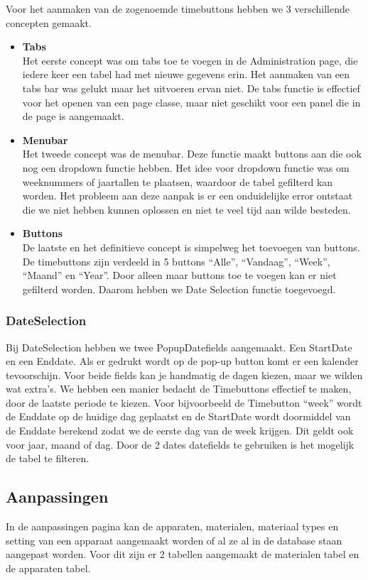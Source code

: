 Voor het aanmaken van de zogenoemde timebuttons hebben we 3 verschillende concepten gemaakt.
\begin {itemize}
\item \textbf{Tabs}\\
Het eerste concept was om tabs toe te voegen in de Administration page, die iedere keer een tabel had met nieuwe gegevens erin. Het aanmaken van een tabs bar was gelukt maar het uitvoeren ervan niet. De tabs functie is effectief voor het openen van een page classe, maar niet geschikt voor een panel die in de page is aangemaakt. 

\item \textbf{Menubar}\\
Het tweede concept was de menubar. Deze functie maakt buttons aan die ook nog een dropdown functie hebben. Het idee voor dropdown functie was om weeknummers of jaartallen te plaatsen, waardoor de tabel gefilterd kan worden. Het probleem aan deze aanpak is er een onduidelijke error ontstaat die we niet hebben kunnen oplossen en niet te veel tijd aan wilde besteden.

\item \textbf{Buttons}\\
De laatste en het definitieve concept is simpelweg het toevoegen van buttons. De timebuttons zijn verdeeld in 5 buttons ``Alle'', ``Vandaag'', ``Week'', ``Maand'' en ``Year''. Door alleen maar buttons toe te voegen kan er niet gefilterd worden. Daarom hebben we Date Selection functie toegevoegd.
\end {itemize}

\subsubsection{DateSelection}
Bij DateSelection hebben we twee PopupDatefields aangemaakt. Een StartDate en een Enddate. Als er gedrukt wordt op de pop-up button komt er een kalender tevoorschijn. Voor beide fields kan je handmatig de dagen kiezen, maar we wilden wat extra’s. 
We hebben een manier bedacht de Timebuttons effectief te maken, door de laatste periode te kiezen. Voor bijvoorbeeld de Timebutton ``week'' wordt de Enddate op de huidige dag geplaatst en de StartDate wordt doormiddel van de Enddate berekend zodat we de eerste dag van de week krijgen. Dit geldt ook voor jaar, maand of dag. 
Door de 2 dates datefields te gebruiken is het mogelijk de tabel te filteren.

\subsection{Aanpassingen}
In de aanpassingen pagina kan de apparaten, materialen, materiaal types en setting van een apparaat aangemaakt worden of al ze al in de database staan aangepast worden. Voor dit zijn er 2 tabellen aangemaakt de materialen tabel en de apparaten tabel.

